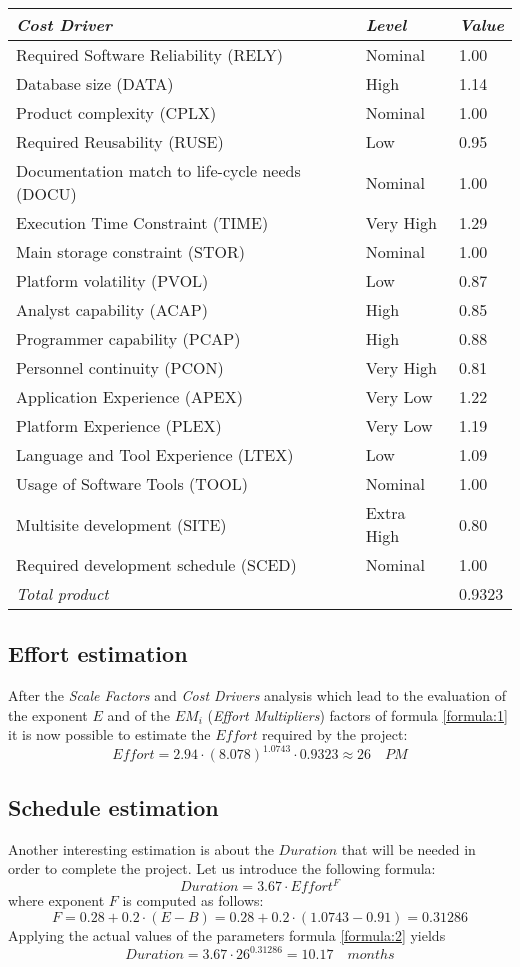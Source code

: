 \documentclass[11pt,a4paper]{report}
\begin{document}
\begin{tabularx}{\textwidth}{|p{8cm}|X|X|}
	\hline
	\textit{Cost Driver} & \textit{Level} & \textit{Value}\\
	\hline
	Required Software Reliability (RELY) & Nominal & 1.00\\
	Database size (DATA) & High & 1.14\\
	Product complexity (CPLX) & Nominal & 1.00\\
	Required Reusability (RUSE) & Low & 0.95\\
	Documentation match to life-cycle needs (DOCU) & Nominal & 1.00\\
	Execution Time Constraint (TIME) & Very High & 1.29\\
	Main storage constraint (STOR) & Nominal & 1.00\\
	Platform volatility (PVOL) & Low & 0.87\\
	Analyst capability (ACAP)&High&0.85\\
	Programmer capability (PCAP) & High & 0.88\\
	Personnel continuity (PCON) & Very High & 0.81\\
	Application Experience (APEX) & Very Low & 1.22\\
	Platform Experience (PLEX) & Very Low & 1.19\\
	Language and Tool Experience (LTEX) & Low & 1.09\\
	Usage of Software Tools (TOOL) & Nominal & 1.00\\
	Multisite development (SITE) & Extra High & 0.80\\
	Required development schedule (SCED) & Nominal & 1.00\\
	\hline
	\textit{Total product} &  &0.9323\\
	\hline
\end{tabularx}
\newpage
\subsection{Effort estimation}
After the \textit{Scale Factors} and \textit{Cost Drivers} analysis which lead to the evaluation of the exponent $E$ and of the $EM_i$ (\textit{Effort Multipliers}) factors of formula \ref{formula:1} it is now possible to estimate the $Effort$ required by the project:
$$
Effort = 2.94 \cdot (8.078)^{1.0743} \cdot 0.9323 \approx 26 \quad PM
$$
\subsection{Schedule estimation}
Another interesting estimation is about the $Duration$ that will be needed in order to complete the project. Let us introduce the following formula:
\begin{equation} \label{formula:2}
Duration = 3.67 \cdot Effort^F
\end{equation}
where exponent $F$ is computed as follows:
$$
F = 0.28 + 0.2 \cdot (E - B) = 0.28 + 0.2 \cdot (1.0743 - 0.91) = 0.31286 
$$
Applying the actual values of the parameters formula \ref{formula:2} yields
$$
Duration = 3.67 \cdot 26^{0.31286} = 10.17 \quad months
$$
\end{document}
